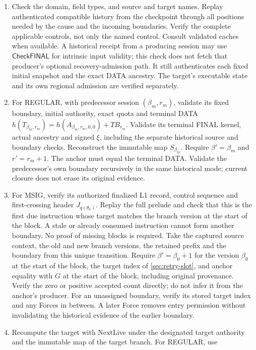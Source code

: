 \documentclass[11pt,a4paper]{article}
\newcommand{\TB}{\mathit{TB}}
\newcommand{\tagg}[1]{\ensuremath{\mathsf{#1}}}
\begin{document}
\begin{enumerate}[label=(\roman*),itemsep=2pt]
\item Check the domain, field types, and source and target names. Replay
authenticated compatible history from the checkpoint through all positions needed by
the cause and the incoming boundaries. Verify
the complete applicable controls, not only the named control. Consult
validated caches when available. A historical receipt from a producing
session may use \tagg{CheckFINAL} for intrinsic input validity; this check
does not fetch that producer's optional recovery-admission path. It still
authenticates each fixed initial snapshot and the exact DATA ancestry. The
target's executable state and its own regional admission are verified
separately.
\item For REGULAR, with predecessor session $(\beta_m,r_m)$, validate
its fixed boundary, initial authority, exact quota and terminal DATA
$h(T_{\beta_m,r_m})=h(A_{\beta_m,r_m,0,0})+\TB_{r_m}$. Validate its terminal
FINAL kernel, actual ancestry and signed $\xi$, including the separate
historical source and boundary checks. Reconstruct the immutable map
$S_{\beta_m}$. Require $\beta'=\beta_m$ and
$r'=r_m+1$. The anchor must equal the terminal DATA. Validate the
predecessor's own boundary recursively in the same historical mode;
current closure does not erase its original evidence.
\item For MSIG, verify its authorized finalized L1 record, control
sequence and first-crossing header $J_{q(\theta_a)}$. Replay the full
prelude and check that this is the first due instruction whose target
matches the branch version at the start of the block. A stale or already
consumed instruction cannot form another boundary. No proof of missing
blocks is required. Take the captured source context, the old and new
branch versions, the retained prefix and the boundary from this unique
transition. Require $\beta'=\beta_0+1$ for the version $\beta_0$ at the start of the block, the target index of
\cref{sec:retry-slot}, and anchor equality with $G$ at the start of the
block, including original provenance. Verify the zero or positive
accepted count directly; do not infer it from the anchor's producer. For
an unassigned boundary, verify its stored target index and any Forces in
between. A later Force removes entry permission without invalidating the
historical evidence of the earlier boundary.
\item Recompute the target with NextLive under the designated target
authority and the immutable map of the target branch. For REGULAR, use

\end{enumerate}
\end{document}
